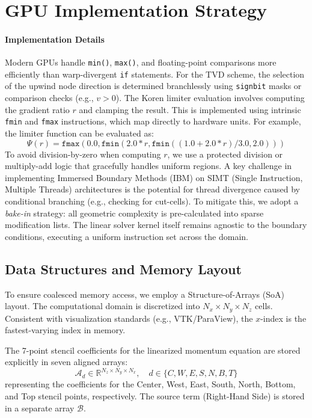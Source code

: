 \documentclass[preprint,12pt]{elsarticle}
\begin{document}
\section{GPU Implementation Strategy}
\paragraph{Implementation Details}
Modern GPUs handle \texttt{min()}, \texttt{max()}, and floating-point comparisons more efficiently than warp-divergent \texttt{if} statements.
For the TVD scheme, the selection of the upwind node direction is determined branchlessly using \texttt{signbit} masks or comparison checks (e.g., $v>0$).
The Koren limiter evaluation involves computing the gradient ratio $r$ and clamping the result. This is implemented using intrinsic \texttt{fmin} and \texttt{fmax} instructions, which map directly to hardware units. For example, the limiter function can be evaluated as:
\begin{equation}
    \Psi(r) = \texttt{fmax}(0.0, \texttt{fmin}(2.0*r, \texttt{fmin}( (1.0+2.0*r)/3.0, 2.0 ) ) )
\end{equation}
To avoid division-by-zero when computing $r$, we use a protected division or multiply-add logic that gracefully handles uniform regions.
A key challenge in implementing Immersed Boundary Methods (IBM) on SIMT (Single Instruction, Multiple Threads) architectures is the potential for thread divergence caused by conditional branching (e.g., checking for cut-cells). To mitigate this, we adopt a \textit{bake-in} strategy: all geometric complexity is pre-calculated into sparse modification lists. The linear solver kernel itself remains agnostic to the boundary conditions, executing a uniform instruction set across the domain.

\subsection{Data Structures and Memory Layout}
To ensure coalesced memory access, we employ a Structure-of-Arrays (SoA) layout. The computational domain is discretized into $N_x \times N_y \times N_z$ cells. Consistent with visualization standards (e.g., VTK/ParaView), the $x$-index is the fastest-varying index in memory. 

The 7-point stencil coefficients for the linearized momentum equation are stored explicitly in seven aligned arrays:
\begin{equation}
    \mathcal{A}_{d} \in \mathbb{R}^{N_z \times N_y \times N_x}, \quad d \in \{C, W, E, S, N, B, T\}
\end{equation}
representing the coefficients for the Center, West, East, South, North, Bottom, and Top stencil points, respectively. The source term (Right-Hand Side) is stored in a separate array $\mathcal{B}$.
\end{document}
